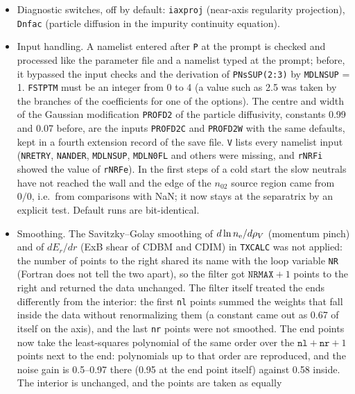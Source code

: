 \documentclass[11pt]{article}
\def\r#1{{\rm#1}}
\begin{document}
\begin{itemize}
  \texttt{MDLNSUP} = 0 uses \texttt{PNsSUP(1:3)} as given.  The SOL loss
  $-\nu_L(n_s - n_{\r{SUP},s})$ holds the SOL density near $n_{\r{SUP},s}$, so
  \texttt{PNsSUP(1)} acts as the upstream SOL density and sets the density level of
  the whole plasma.
\item Diagnostic switches, off by default: \texttt{iaxproj} (near-axis
  regularity projection), \texttt{Dnfac} (particle diffusion in the impurity
  continuity equation).
\item Input handling.  A namelist entered after \texttt{P} at the prompt is checked and
  processed like the parameter file and a namelist typed at the prompt; before, it bypassed
  the input checks and the derivation of \texttt{PNsSUP(2:3)} by \texttt{MDLNSUP} = 1.
  \texttt{FSTPTM} must be an integer from 0 to 4 (a value such as 2.5 was taken by the
  branches of the coefficients for one of the options).  The centre and width of the Gaussian
  modification \texttt{PROFD2} of the particle diffusivity, constants 0.99 and 0.07 before, are
  the inputs \texttt{PROFD2C} and \texttt{PROFD2W} with the same defaults, kept in a fourth
  extension record of the save file.  \texttt{V} lists every namelist input (\texttt{NRETRY},
  \texttt{NANDER}, \texttt{MDLNSUP}, \texttt{MDLN0FL} and others were missing, and
  \texttt{rNRFi} showed the value of \texttt{rNRFe}).  In the first steps of a cold start the
  slow neutrals have not reached the wall and the edge of the $n_{02}$ source region came from
  $0/0$, i.e.\ from comparisons with NaN; it now stays at the separatrix by an explicit test.
  Default runs are bit-identical.
\item Smoothing.  The Savitzky--Golay smoothing of $d\ln n_\r{e}/d\rho_V$ (momentum pinch) and
  of $dE_r/dr$ (ExB shear of CDBM and CDIM) in \texttt{TXCALC} was not applied: the number of
  points to the right shared its name with the loop variable \texttt{NR} (Fortran does not
  tell the two apart), so the filter got $\texttt{NRMAX}+1$ points to the right and returned
  the data unchanged.  The filter itself treated the ends differently from the interior: the
  first \texttt{nl} points summed the weights that fall inside the data without
  renormalizing them (a constant came out as 0.67 of itself on the axis), and the last
  \texttt{nr} points were not smoothed.  The end points now take the least-squares polynomial
  of the same order over the $\texttt{nl}+\texttt{nr}+1$ points next to the end: polynomials up
  to that order are reproduced, and the noise gain is 0.5--0.97 there (0.95 at the end point
  itself) against 0.58 inside.  The interior is unchanged, and the points are taken as equally

\end{itemize}
\end{document}
